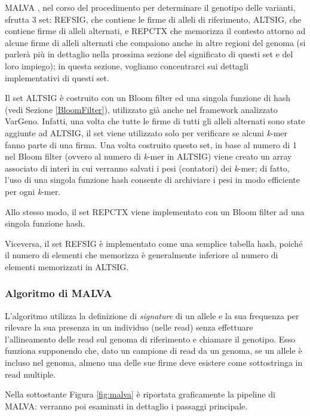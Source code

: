 \documentclass[../main.tex]{subfiles}
\begin{document}
MALVA , nel corso del procedimento per determinare il genotipo delle varianti, sfrutta 3 set: REFSIG, che contiene le firme di alleli di riferimento, ALTSIG, che contiene firme di alleli alternati, e REPCTX che memorizza il contesto attorno ad alcune firme di alleli alternati che compaiono anche in altre regioni del genoma (si parlerà più in dettaglio nella prossima sezione del significato di questi set e del loro impiego); in questa sezione, vogliamo concentrarci sui dettagli implementativi di questi set.

Il set ALTSIG è costruito con un Bloom filter ed una singola funzione di hash (vedi Sezione \ref{BloomFilter}), utilizzato già anche nel framework analizzato VarGeno. Infatti, una volta che tutte le firme di tutti gli alleli alternati sono state aggiunte ad ALTSIG, il set viene utilizzato solo per verificare se alcuni \textit{k}-mer fanno parte di una firma. Una volta costruito questo set, in base al numero di 1 nel Bloom filter (ovvero al numero di \textit{k}-mer in ALTSIG) viene creato un array associato di interi in cui verranno salvati i pesi (contatori) dei \textit{k}-mer; di fatto, l'uso di una singola funzione hash consente di archiviare i pesi in modo efficiente per ogni \textit{k}-mer.
 
Allo stesso modo, il set REPCTX viene implementato con un Bloom filter ad una singola funzione hash. 

Viceversa, il set REFSIG è implementato come una semplice tabella hash, poiché il numero di elementi che memorizza è generalmente inferiore al numero di elementi memorizzati in ALTSIG. 


\subsubsection{Algoritmo di MALVA}

L'algoritmo utilizza la definizione di \textit{signature} di un allele e la sua frequenza per rilevare la sua presenza in un individuo (nelle read) senza effettuare l'allineamento delle read sul genoma di riferimento e chiamare il genotipo. Esso funziona supponendo che, dato un campione di read da un genoma, se un allele è incluso nel genoma, almeno una delle sue firme deve esistere come sottostringa in read multiple.

Nella sottostante Figura \ref{fig:malva} è riportata graficamente la pipeline di MALVA: verranno poi esaminati in dettaglio i passaggi principale.
\end{document}
